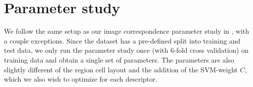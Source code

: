 \documentclass[thesis.tex]{subfiles}
\begin{document}
\section{Parameter study}
\label{sec:odParameterStudy}
%
%
%

We follow the same setup as our image correspondence parameter study in , with a couple exceptions. Since the dataset has a pre-defined split into training and test data, we only run the parameter study once (with 6-fold cross validation) on training data and obtain a single set of parameters. The parameters are also slightly different of the region cell layout and the addition of the SVM-weight $C$, which we also wish to optimize for each descriptor.
\end{document}
